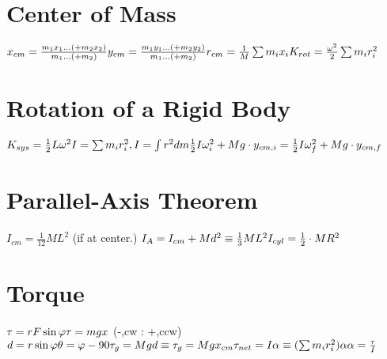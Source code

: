 \documentclass[11pt]{article}
\begin{document}
    \begin{paracol}{3}
        \section*{Center of Mass}
        \begin{fleqn}
            $
            x_{cm} = \frac{m_1x_1...(+m_2x_2)}{m_1...(+m_2)} \newline
            y_{cm} = \frac{m_1y_1...(+m_2y_2)}{m_1...(+m_2)} \newline
            r_{cm} = \frac1M \sum m_{i}x_i \newline
            K_{rot} = \frac{\omega^2}{2}\sum m_i r_i^2
            $
        \end{fleqn}
        \section*{Rotation of a Rigid Body}
        \begin{fleqn}
            $
            K_{sys} = \frac12 L \omega^2 \newline
            I = \sum m_{i} r_i^2, I = \int r^2 dm \newline
            \frac12 I \omega_i^2 + Mg\cdot y_{cm,i} = \frac 12 I \omega_f^2 + Mg\cdot y_{cm,f} \newline
            $
        \end{fleqn}
        \section*{Parallel-Axis Theorem}
        \begin{fleqn}
            $
            I_{cm} = \frac{1}{12} ML^2 $ (if at center.) $ \newline
            I_A = I_{cm} + Md^2 \equiv \frac13 ML^2 \newline
            I_{cyl} = \frac12 \cdot MR^2
            $
        \end{fleqn}
        \newline
        \section*{Torque}
        \begin{fleqn}
            $
            \tau = rF \sin\varphi \newline
            \tau = mgx \newline
            $ (-,cw : +,ccw)$ \newline
            d = r \sin\varphi \newline
            \theta = \varphi - 90 \newline
            \tau_g = Mgd \equiv \tau_g = Mgx_{cm} \newline
            \tau_{net} = I\alpha \equiv (\sum m_i r_i^2)\alpha \newline
            \alpha = \frac{\tau}{I}
            $
        \end{fleqn}

\end{paracol}
\end{document}
